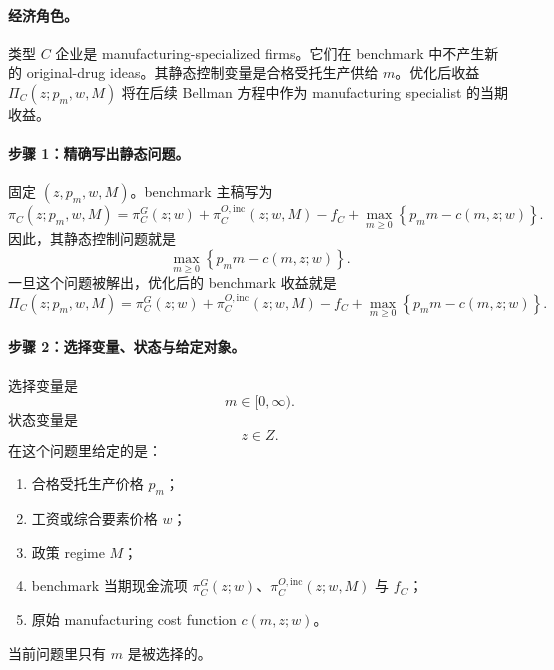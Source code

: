 \paragraph{经济角色。}
类型 $C$ 企业是 manufacturing-specialized firms。它们在 benchmark 中不产生新的 original-drug ideas。其静态控制变量是合格受托生产供给 $m$。优化后收益 $\Pi_C(z;p_m,w,M)$ 将在后续 Bellman 方程中作为 manufacturing specialist 的当期收益。

\paragraph{步骤 1：精确写出静态问题。}
固定 $(z,p_m,w,M)$。benchmark 主稿写为
\begin{equation}
\pi_C(z;p_m,w,M)
=
\pi_C^G(z;w)+\pi_C^{O,\mathrm{inc}}(z;w,M)-f_C
+\max_{m\ge 0}\left\{p_m m-c(m,z;w)\right\}.
\label{eq:p2C_benchmark_payoff}
\end{equation}
因此，其静态控制问题就是
\begin{equation}
\max_{m\ge 0}\left\{p_m m-c(m,z;w)\right\}.
\label{eq:p2C_problem}
\end{equation}
一旦这个问题被解出，优化后的 benchmark 收益就是
\begin{equation}
\Pi_C(z;p_m,w,M)
=
\pi_C^G(z;w)+\pi_C^{O,\mathrm{inc}}(z;w,M)-f_C
+\max_{m\ge 0}\left\{p_m m-c(m,z;w)\right\}.
\label{eq:p2C_optimized_definition}
\end{equation}

\paragraph{步骤 2：选择变量、状态与给定对象。}
选择变量是
\[
m\in[0,\infty).
\]
状态变量是
\[
z\in Z.
\]
在这个问题里给定的是：
\begin{enumerate}
    \item 合格受托生产价格 $p_m$；
    \item 工资或综合要素价格 $w$；
    \item 政策 regime $M$；
    \item benchmark 当期现金流项 $\pi_C^G(z;w)$、$\pi_C^{O,\mathrm{inc}}(z;w,M)$ 与 $f_C$；
    \item 原始 manufacturing cost function $c(m,z;w)$。
\end{enumerate}
当前问题里只有 $m$ 是被选择的。

